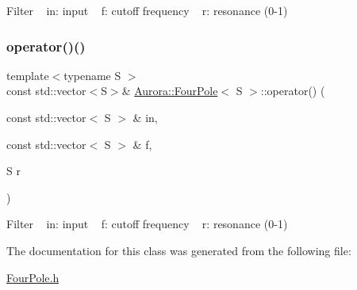 Filter ~\newline
in\+: input ~\newline
f\+: cutoff frequency ~\newline
r\+: resonance (0-\/1) \mbox{\label{class_aurora_1_1_four_pole_a300ec87b54b5e8c5c76c1005fe31c9d9}} 
\subsubsection{\texorpdfstring{operator()()}{operator()()}\hspace{0.1cm}{\footnotesize\ttfamily [2/2]}}
{\footnotesize\ttfamily template$<$typename S $>$ \\
const std\+::vector$<$S$>$\& \hyperlink{class_aurora_1_1_four_pole}{Aurora\+::\+Four\+Pole}$<$ S $>$\+::operator() (\begin{DoxyParamCaption}\item[{const std\+::vector$<$ S $>$ \&}]{in,  }\item[{const std\+::vector$<$ S $>$ \&}]{f,  }\item[{S}]{r }\end{DoxyParamCaption})\hspace{0.3cm}{\ttfamily [inline]}}

Filter ~\newline
in\+: input ~\newline
f\+: cutoff frequency ~\newline
r\+: resonance (0-\/1) 

The documentation for this class was generated from the following file\+:\begin{DoxyCompactItemize}
\item 
\hyperlink{_four_pole_8h}{Four\+Pole.\+h}\end{DoxyCompactItemize}
